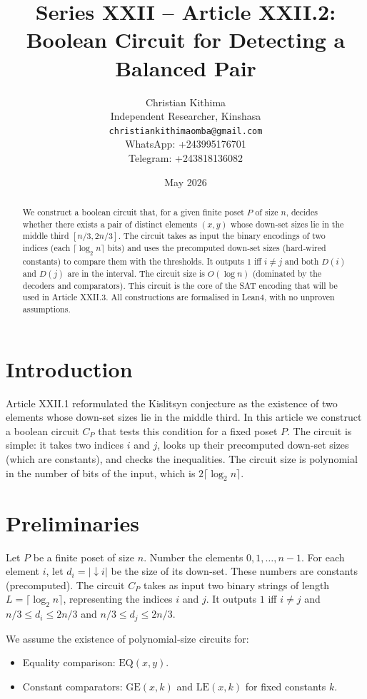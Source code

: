 \documentclass[11pt,a4paper]{article}
\title{Series XXII – Article XXII.2: Boolean Circuit for Detecting a Balanced Pair}
\author{Christian Kithima \\
Independent Researcher, Kinshasa \\
\texttt{christiankithimaomba@gmail.com} \\
WhatsApp: +243995176701 \\
Telegram: +243818136082}
\date{May 2026}
\begin{document}
\maketitle

\begin{abstract}
We construct a boolean circuit that, for a given finite poset $P$ of size $n$, decides whether there exists a pair of distinct elements $(x,y)$ whose down‑set sizes lie in the middle third $[n/3, 2n/3]$. The circuit takes as input the binary encodings of two indices (each $\lceil \log_2 n\rceil$ bits) and uses the precomputed down‑set sizes (hard‑wired constants) to compare them with the thresholds. It outputs $1$ iff $i \neq j$ and both $D(i)$ and $D(j)$ are in the interval. The circuit size is $O(\log n)$ (dominated by the decoders and comparators). This circuit is the core of the SAT encoding that will be used in Article XXII.3. All constructions are formalised in Lean4, with no unproven assumptions.
\end{abstract}

\tableofcontents

\section{Introduction}

Article XXII.1 reformulated the Kislitsyn conjecture as the existence of two elements whose down‑set sizes lie in the middle third. In this article we construct a boolean circuit $C_P$ that tests this condition for a fixed poset $P$. The circuit is simple: it takes two indices $i$ and $j$, looks up their precomputed down‑set sizes (which are constants), and checks the inequalities. The circuit size is polynomial in the number of bits of the input, which is $2\lceil \log_2 n\rceil$.

\section{Preliminaries}

Let $P$ be a finite poset of size $n$. Number the elements $0,1,\dots,n-1$. For each element $i$, let $d_i = |\downarrow i|$ be the size of its down‑set. These numbers are constants (precomputed). The circuit $C_P$ takes as input two binary strings of length $L = \lceil \log_2 n\rceil$, representing the indices $i$ and $j$. It outputs $1$ iff $i \neq j$ and $n/3 \le d_i \le 2n/3$ and $n/3 \le d_j \le 2n/3$.

We assume the existence of polynomial‑size circuits for:
\begin{itemize}
\item Equality comparison: $\mathrm{EQ}(x,y)$.
\item Constant comparators: $\mathrm{GE}(x, k)$ and $\mathrm{LE}(x, k)$ for fixed constants $k$.
\end{itemize}
\end{document}
